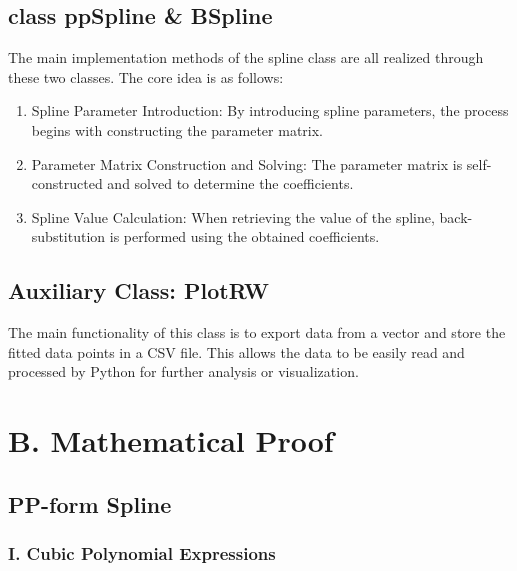 \documentclass[a4paper]{article}
\begin{document}
\subsection*{class ppSpline \& BSpline}
The main implementation methods of the spline class are all realized through these two classes. The core idea is as follows:
\begin{enumerate}
    \item Spline Parameter Introduction: By introducing spline parameters, the process begins with constructing the parameter matrix. 
    \item Parameter Matrix Construction and Solving: The parameter matrix is self-constructed and solved to determine the coefficients.
    \item Spline Value Calculation: When retrieving the value of the spline, back-substitution is performed using the obtained coefficients.
\end{enumerate}

\subsection{Auxiliary Class: PlotRW}
The main functionality of this class is to export data from a vector and store the fitted data points in a CSV file. This allows the data to be easily read and processed by Python for further analysis or visualization.


\section*{B. Mathematical Proof}

\subsection*{PP-form Spline}

\subsubsection*{I. Cubic Polynomial Expressions}
\end{document}
